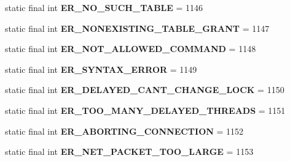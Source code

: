 \begin{DoxyCompactItemize}
static final int {\bfseries E\+R\+\_\+\+N\+O\+\_\+\+S\+U\+C\+H\+\_\+\+T\+A\+B\+LE} = 1146
\item 
\mbox{\label{classcom_1_1mysql_1_1jdbc_1_1_mysql_error_numbers_ae2c5ff7f984b3e1d852706763b56e10e}} 
static final int {\bfseries E\+R\+\_\+\+N\+O\+N\+E\+X\+I\+S\+T\+I\+N\+G\+\_\+\+T\+A\+B\+L\+E\+\_\+\+G\+R\+A\+NT} = 1147
\item 
\mbox{\label{classcom_1_1mysql_1_1jdbc_1_1_mysql_error_numbers_a4290d8bedf0926f320ef5adf297f2de7}} 
static final int {\bfseries E\+R\+\_\+\+N\+O\+T\+\_\+\+A\+L\+L\+O\+W\+E\+D\+\_\+\+C\+O\+M\+M\+A\+ND} = 1148
\item 
\mbox{\label{classcom_1_1mysql_1_1jdbc_1_1_mysql_error_numbers_a7ee7c2c3dbb8f3329d0e5f1aa5c6fe16}} 
static final int {\bfseries E\+R\+\_\+\+S\+Y\+N\+T\+A\+X\+\_\+\+E\+R\+R\+OR} = 1149
\item 
\mbox{\label{classcom_1_1mysql_1_1jdbc_1_1_mysql_error_numbers_afbc5603bcbbcc3a4a8745dc54e605b73}} 
static final int {\bfseries E\+R\+\_\+\+D\+E\+L\+A\+Y\+E\+D\+\_\+\+C\+A\+N\+T\+\_\+\+C\+H\+A\+N\+G\+E\+\_\+\+L\+O\+CK} = 1150
\item 
\mbox{\label{classcom_1_1mysql_1_1jdbc_1_1_mysql_error_numbers_afe1633a9f5b392a558c2f18198a4a48c}} 
static final int {\bfseries E\+R\+\_\+\+T\+O\+O\+\_\+\+M\+A\+N\+Y\+\_\+\+D\+E\+L\+A\+Y\+E\+D\+\_\+\+T\+H\+R\+E\+A\+DS} = 1151
\item 
\mbox{\label{classcom_1_1mysql_1_1jdbc_1_1_mysql_error_numbers_a14047573f1ea3dc2cdefe9cea99daffb}} 
static final int {\bfseries E\+R\+\_\+\+A\+B\+O\+R\+T\+I\+N\+G\+\_\+\+C\+O\+N\+N\+E\+C\+T\+I\+ON} = 1152
\item 
\mbox{\label{classcom_1_1mysql_1_1jdbc_1_1_mysql_error_numbers_add2eab56957c4f77df1450997b0df09d}} 
static final int {\bfseries E\+R\+\_\+\+N\+E\+T\+\_\+\+P\+A\+C\+K\+E\+T\+\_\+\+T\+O\+O\+\_\+\+L\+A\+R\+GE} = 1153
\item 

\end{DoxyCompactItemize}
